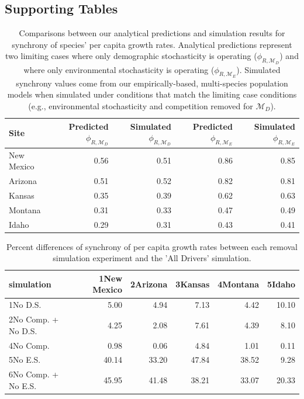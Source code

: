 \documentclass[12pt,]{article}
\begin{document}
\newpage{}

\subsection{Supporting Tables}\label{supporting-tables}

\begin{table}[ht]
\centering
\caption{Comparisons between our analytical predictions and simulation results for synchrony of species' per capita growth rates. Analytical predictions represent two limiting cases where only demographic stochasticity is operating ($\phi_{R,\mathcal{M}_D}$) and where only environmental stochasticity is operating ($\phi_{R,\mathcal{M}_E}$). Simulated synchrony values come from our empirically-based, multi-species population models when simulated under conditions that match the limiting case conditions (e.g., environmental stochasticity and competition removed for $\mathcal{M}_D$).} 
{\normalsize
\begin{tabular}{lrrrr}
  \hline
Site & Predicted $\phi_{R,\mathcal{M}_D}$ & Simulated $\phi_{R,\mathcal{M}_D}$ & Predicted $\phi_{R,\mathcal{M}_E}$ & Simulated $\phi_{R,\mathcal{M}_E}$ \\ 
  \hline
New Mexico & 0.56 & 0.51 & 0.86 & 0.85 \\ 
  Arizona & 0.51 & 0.52 & 0.82 & 0.81 \\ 
  Kansas & 0.35 & 0.39 & 0.62 & 0.63 \\ 
  Montana & 0.31 & 0.33 & 0.47 & 0.49 \\ 
  Idaho & 0.29 & 0.31 & 0.43 & 0.41 \\ 
   \hline
\end{tabular}
}
\end{table}

\newpage{}

\begin{table}[ht]
\centering
\caption{Percent differences of synchrony of per capita growth rates between each removal simulation experiment and the 'All Drivers' simulation.} 
\begin{tabular}{lrrrrr}
  \hline
simulation & 1New Mexico & 2Arizona & 3Kansas & 4Montana & 5Idaho \\ 
  \hline
1No D.S. & 5.00 & 4.94 & 7.13 & 4.42 & 10.10 \\ 
  2No Comp. + No D.S. & 4.25 & 2.08 & 7.61 & 4.39 & 8.10 \\ 
  4No Comp. & 0.98 & 0.06 & 4.84 & 1.01 & 0.11 \\ 
  5No E.S. & 40.14 & 33.20 & 47.84 & 38.52 & 9.28 \\ 
  6No Comp. + No E.S. & 45.95 & 41.48 & 38.21 & 33.07 & 20.33 \\ 
   \hline
\end{tabular}
\end{table}
\end{document}

